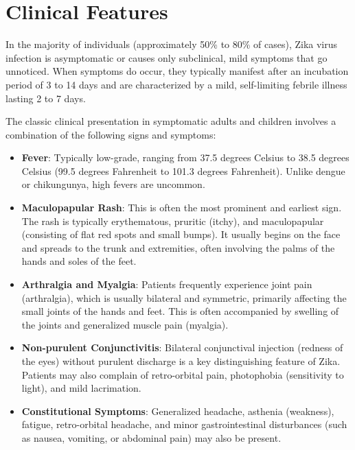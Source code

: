\section*{Clinical Features}
In the majority of individuals (approximately 50\% to 80\% of cases), Zika virus infection is asymptomatic or causes only subclinical, mild symptoms that go unnoticed. When symptoms do occur, they typically manifest after an incubation period of 3 to 14 days and are characterized by a mild, self-limiting febrile illness lasting 2 to 7 days.

The classic clinical presentation in symptomatic adults and children involves a combination of the following signs and symptoms:
\begin{itemize}
    \item \textbf{Fever}: Typically low-grade, ranging from 37.5 degrees Celsius to 38.5 degrees Celsius (99.5 degrees Fahrenheit to 101.3 degrees Fahrenheit). Unlike dengue or chikungunya, high fevers are uncommon.
    \item \textbf{Maculopapular Rash}: This is often the most prominent and earliest sign. The rash is typically erythematous, pruritic (itchy), and maculopapular (consisting of flat red spots and small bumps). It usually begins on the face and spreads to the trunk and extremities, often involving the palms of the hands and soles of the feet.
    \item \textbf{Arthralgia and Myalgia}: Patients frequently experience joint pain (arthralgia), which is usually bilateral and symmetric, primarily affecting the small joints of the hands and feet. This is often accompanied by swelling of the joints and generalized muscle pain (myalgia).
    \item \textbf{Non-purulent Conjunctivitis}: Bilateral conjunctival injection (redness of the eyes) without purulent discharge is a key distinguishing feature of Zika. Patients may also complain of retro-orbital pain, photophobia (sensitivity to light), and mild lacrimation.
    \item \textbf{Constitutional Symptoms}: Generalized headache, asthenia (weakness), fatigue, retro-orbital headache, and minor gastrointestinal disturbances (such as nausea, vomiting, or abdominal pain) may also be present.
\end{itemize}

